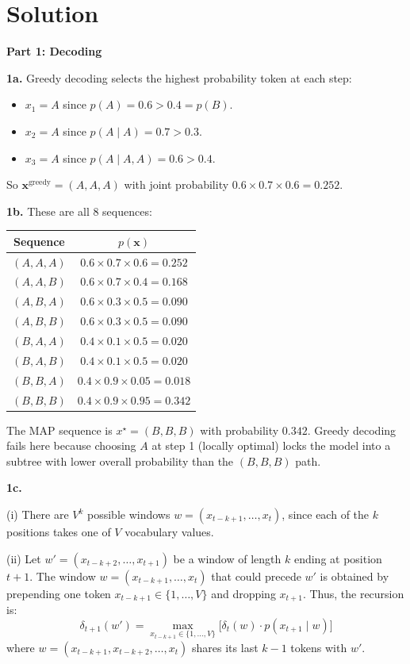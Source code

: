 \documentclass[submit]{../harvardml}
\newenvironment{solution}
  {\color{blue}\section*{Solution}}
{}
\begin{document}
\begin{solution}

\textbf{Part 1: Decoding}

\textbf{1a.} Greedy decoding selects the highest probability token at each step:
\begin{itemize}
  \item $x_1 = A$ since $p(A) = 0.6 > 0.4 = p(B)$.
  \item $x_2 = A$ since $p(A \mid A) = 0.7 > 0.3$.
  \item $x_3 = A$ since $p(A \mid A,A) = 0.6 > 0.4$.
\end{itemize}
So $\mathbf{x}^{\text{greedy}} = (A,A,A)$ with joint probability $0.6 \times 0.7 \times 0.6 = 0.252$.

\textbf{1b.} These are all 8 sequences:

\begin{center}
\begin{tabular}{c|c}
Sequence & $p(\mathbf{x})$ \\ \hline
$(A,A,A)$ & $0.6 \times 0.7 \times 0.6 = 0.252$ \\
$(A,A,B)$ & $0.6 \times 0.7 \times 0.4 = 0.168$ \\
$(A,B,A)$ & $0.6 \times 0.3 \times 0.5 = 0.090$ \\
$(A,B,B)$ & $0.6 \times 0.3 \times 0.5 = 0.090$ \\
$(B,A,A)$ & $0.4 \times 0.1 \times 0.5 = 0.020$ \\
$(B,A,B)$ & $0.4 \times 0.1 \times 0.5 = 0.020$ \\
$(B,B,A)$ & $0.4 \times 0.9 \times 0.05 = 0.018$ \\
$(B,B,B)$ & $0.4 \times 0.9 \times 0.95 = \mathbf{0.342}$ \\
\end{tabular}
\end{center}

The MAP sequence is $x^{\star} = (B,B,B)$ with probability $0.342$. Greedy decoding fails here because choosing $A$ at step 1 (locally optimal) locks the model into a subtree with lower overall probability than the $(B, B, B)$ path.

\textbf{1c.}

(i) There are $V^k$ possible windows $w = (x_{t-k+1}, \ldots, x_t)$, since each of the $k$ positions takes one of $V$ vocabulary values.

(ii) Let $w' = (x_{t-k+2}, \ldots, x_{t+1})$ be a window of length $k$ ending at position $t+1$. The window $w = (x_{t-k+1}, \ldots, x_t)$ that could precede $w'$ is obtained by prepending one token $x_{t-k+1} \in \{1,\ldots,V\}$ and dropping $x_{t+1}$. Thus, the recursion is:
\[
\delta_{t+1}(w') = \max_{x_{t-k+1} \in \{1,\ldots,V\}} \Big[\delta_t(w) \cdot p(x_{t+1} \mid w)\Big]
\]
where $w = (x_{t-k+1}, x_{t-k+2}, \ldots, x_t)$ shares its last $k-1$ tokens with $w'$.


\end{solution}
\end{document}
